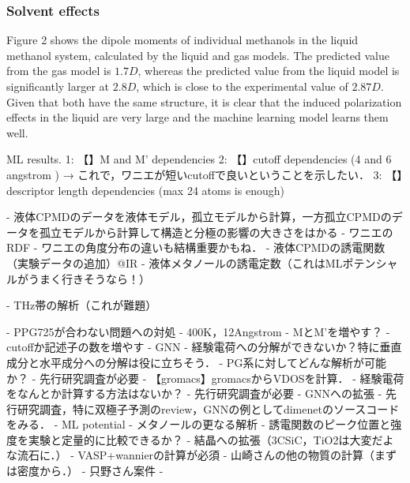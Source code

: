 \subsubsection{Solvent effects}
Figure 2 shows the dipole moments of individual methanols in the liquid methanol system, calculated by the liquid and gas models. The predicted value from the gas model is $1.7D$, whereas the predicted value from the liquid model is significantly larger at $2.8D$, which is close to the experimental value of $2.87D$. Given that both have the same structure, it is clear that the induced polarization effects in the liquid are very large and the machine learning model learns them well.


\begin{comment}
 Methanol re-fitting 孤立
1: 【pgfplotへの変換】Fitting result $y=x$
2: 【作図】Bond Dipole match histgram with deviation histgram
3: 
3: 【作図】Dipole match along MD trajectory with errors
4: 【作図】Molecule Dipole size histgram


- fittingの経過（epoch数との関係）
- 分子双極子のヒストグラム
- ボンドごとの双極子のヒストグラム
- trajectoryに沿った双極子
- 真値(DFT)との双極子の誤差
- 【多分コーディングが必要】ボンドとワニエの位置関係（角度分布や距離分布）
\end{comment}


ML results.
1: 【】M and M' dependencies
2: 【】cutoff dependencies (4 and 6 angstrom ) →  これで，ワニエが短いcutoffで良いということを示したい．
3: 【】descriptor length dependencies (max 24 atoms is enough)

- 液体CPMDのデータを液体モデル，孤立モデルから計算，一方孤立CPMDのデータを孤立モデルから計算して構造と分極の影響の大きさをはかる
- ワニエのRDF
- ワニエの角度分布の違いも結構重要かもね．
- 液体CPMDの誘電関数（実験データの追加）@IR
- 液体メタノールの誘電定数（これはMLポテンシャルがうまく行きそうなら！）

- THz帯の解析（これが難題）





- PPG725が合わない問題への対処
    - 400K，12Angstrom
    - MとM'を増やす？
    - cutoffか記述子の数を増やす
    - GNN
    - 経験電荷への分解ができないか？特に垂直成分と水平成分への分解は役に立ちそう．
- PG系に対してどんな解析が可能か？
    - 先行研究調査が必要
    - 【gromacs】gromacsからVDOSを計算．
- 経験電荷をなんとか計算する方法はないか？
    - 先行研究調査が必要
- GNNへの拡張
    - 先行研究調査，特に双極子予測のreview，GNNの例としてdimenetのソースコードをみる．
- ML potential
- メタノールの更なる解析
   - 誘電関数のピーク位置と強度を実験と定量的に比較できるか？
- 結晶への拡張（3CSiC，TiO2は大変だよな流石に．）
    - VASP+wannierの計算が必須
- 山崎さんの他の物質の計算（まずは密度から．）
- 只野さん案件
- 